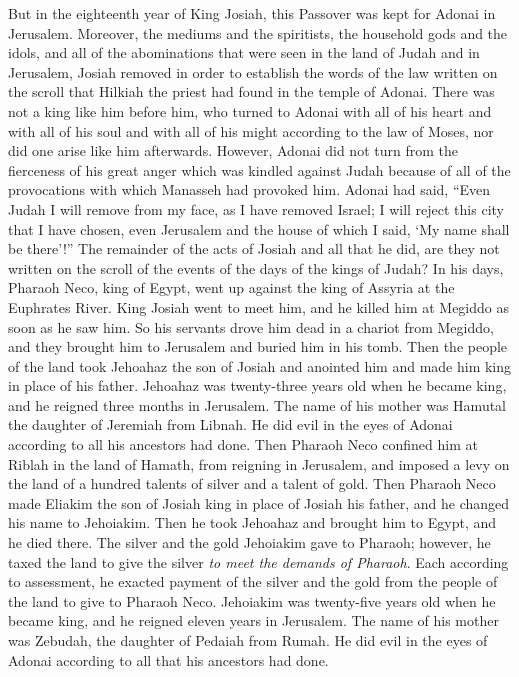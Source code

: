 \begin{biblechapter}
\verse But in the eighteenth year of King Josiah, this Passover was kept for Adonai in Jerusalem.
\verse Moreover, the mediums and the spiritists, the household gods and the idols, and all of the abominations that were seen in the land of Judah and in Jerusalem, Josiah removed in order to establish the words of the law written on the scroll that Hilkiah the priest had found in the temple of Adonai.
\verse There was not a king like him before him, who turned to Adonai with all of his heart and with all of his soul and with all of his might according to the law of Moses, nor did one arise like him afterwards.
\verse However, Adonai did not turn from the fierceness of his great anger which was kindled against Judah because of all of the provocations with which Manasseh had provoked him.
\verse Adonai had said, “Even Judah I will remove from my face, as I have removed Israel; I will reject this city that I have chosen, even Jerusalem and the house of which I said, ‘My name shall be there’!”
\verse The remainder of the acts of Josiah and all that he did, are they not written on the scroll of the events of the days of the kings of Judah?
\verse In his days, Pharaoh Neco, king of Egypt, went up against the king of Assyria at the Euphrates River. King Josiah went to meet him, and he killed him at Megiddo as soon as he saw him.
\verse So his servants drove him dead in a chariot from Megiddo, and they brought him to Jerusalem and buried him in his tomb. Then the people of the land took Jehoahaz the son of Josiah and anointed him and made him king in place of his father.
 Jehoahaz was twenty-three years old when he became king, and he reigned three months in Jerusalem. The name of his mother was Hamutal the daughter of Jeremiah from Libnah.
\verse He did evil in the eyes of Adonai according to all his ancestors had done.
\verse Then Pharaoh Neco confined him at Riblah in the land of Hamath, from reigning in Jerusalem, and imposed a levy on the land of a hundred talents of silver and a talent of gold.
 Then Pharaoh Neco made Eliakim the son of Josiah king in place of Josiah his father, and he changed his name to Jehoiakim. Then he took Jehoahaz and brought him to Egypt, and he died there.
\verse The silver and the gold Jehoiakim gave to Pharaoh; however, he taxed the land to give the silver \textit{to meet the demands of Pharaoh}. Each according to assessment, he exacted payment of the silver and the gold from the people of the land to give to Pharaoh Neco.
\verse Jehoiakim was twenty-five years old when he became king, and he reigned eleven years in Jerusalem. The name of his mother was Zebudah, the daughter of Pedaiah from Rumah.
\verse He did evil in the eyes of Adonai according to all that his ancestors had done.
\end{biblechapter}

